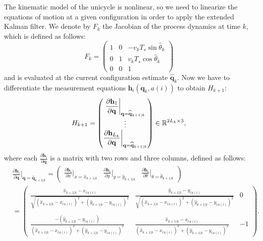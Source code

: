 \documentclass[10pt, a4paper]{report}
\newcommand{\q}{{\mathbf q}}
\begin{document}
The kinematic model of the unicycle is nonlinear, so we need to linearize the equations of motion at a given configuration in order to apply the extended Kalman filter. We denote by $F_k$ the Jacobian of the process dynamics at time $k$, which is defined as follows:\begin{equation}
    F_k=\begin{pmatrix}
        1&0&-v_kT_s\sin\widehat{\theta}_k\\
        0&1&v_kT_s\cos\widehat{\theta}_k\\
        0&0&1
    \end{pmatrix}
\end{equation}
and is evaluated at the current configuration estimate $\widehat{\q}_k$. Now we have to differentiate the measurement equations $ \mathbf h_i({\q_k},a(i))$ to obtain $H_{k+1}$:\begin{equation}
    H_{k+1}=\begin{pmatrix}
        \displaystyle\frac{\partial  \mathbf h_1}{\partial \q}\bigg|_{\q=\widehat\q_{k+1|k}}\\ \vdots \\ 
        \displaystyle\frac{\partial  \mathbf h_{L_k}}{\partial \q}\bigg|_{\q=\widehat\q_{k+1|k}}
    \end{pmatrix}\in \R^{2L_k\times 3},
\end{equation}
where each 
$\frac{\partial  \mathbf h_i}{\partial \q}$ is a matrix with two rows and three columns, defined as follows:
\begin{align}
&\frac{\partial \mathbf{h}_i}{\partial \mathbf{q}} \bigg|_{\mathbf{q} = \widehat{\mathbf{q}}_{k+1|k}}=
\begin{pmatrix}
   \displaystyle\frac{\partial \mathbf{h}_i}{\partial x} \bigg|_{x = \widehat{x}_{k+1|k}}&
   \displaystyle\frac{\partial \mathbf{h}_i}{\partial y} \bigg|_{y = \widehat{y}_{k+1|k}}&
   \displaystyle\frac{\partial \mathbf{h}_i}{\partial \theta} \bigg|_{\theta = \widehat\theta_{k+1|k}}
\end{pmatrix}
\\[2ex] 
&=\begin{pmatrix}\displaystyle 
\frac{\widehat{x}_{k+1|k} - x_{l \, a(i)}}{\sqrt{(\widehat{x}_{k+1|k} - x_{l \, a(i)})^2 + (\widehat{y}_{k+1|k} - y_{l \, a(i)})^2}} & \displaystyle 
\frac{\widehat{y}_{k+1|k} - y_{l \, a(i)}}{\sqrt{(\widehat{x}_{k+1|k} - x_{l \, a(i)})^2 + (\widehat{y}_{k+1|k} - y_{l \, a(i)})^2}} & 
0 \\ \\
\displaystyle 
\frac{-(\widehat{y}_{k+1|k} - y_{l \, a(i)})}{(\widehat{x}_{k+1|k} - x_{l \, a(i)})^2 + (\widehat{y}_{k+1|k} - y_{l \, a(i)})^2} & \displaystyle 
\frac{\widehat{x}_{k+1|k} - x_{l \, a(i)}}{(\widehat{x}_{k+1|k} - x_{l \, a(i)})^2 + (\widehat{y}_{k+1|k} - y_{l \, a(i)})^2} & 
-1 
\end{pmatrix}.
\end{align}
\end{document}
